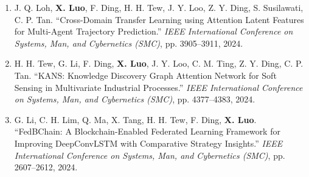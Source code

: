 \documentclass[letterpaper,11pt]{article}
\begin{document}
\begin{justifying}
\begin{enumerate}
\item J. Q. Loh, \textbf{X. Luo}, F. Ding, H. H. Tew, J. Y. Loo, Z. Y. Ding, S. Susilawati, C. P. Tan. “Cross-Domain Transfer Learning using Attention Latent Features for Multi-Agent Trajectory Prediction.” \textit{IEEE International Conference on Systems, Man, and Cybernetics (SMC)}, pp. 3905–3911, 2024.

\item H. H. Tew, G. Li, F. Ding, \textbf{X. Luo}, J. Y. Loo, C. M. Ting, Z. Y. Ding, C. P. Tan. “KANS: Knowledge Discovery Graph Attention Network for Soft Sensing in Multivariate Industrial Processes.” \textit{IEEE International Conference on Systems, Man, and Cybernetics (SMC)}, pp. 4377–4383, 2024.

\item G. Li, C. H. Lim, Q. Ma, X. Tang, H. H. Tew, F. Ding, \textbf{X. Luo}. “FedBChain: A Blockchain-Enabled Federated Learning Framework for Improving DeepConvLSTM with Comparative Strategy Insights.” \textit{IEEE International Conference on Systems, Man, and Cybernetics (SMC)}, pp. 2607–2612, 2024.

\end{enumerate}
\end{justifying}
\end{document}
